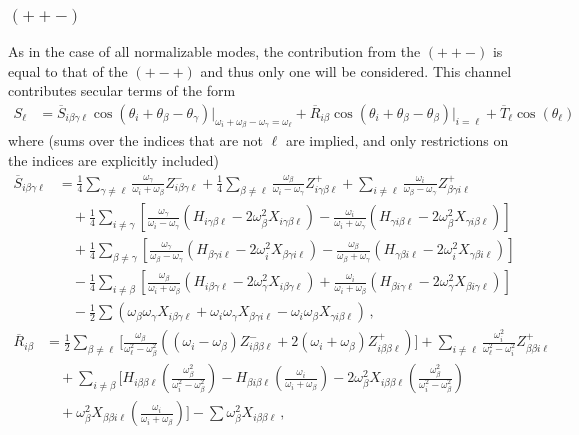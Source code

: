 \documentclass[letterpaper,11pt]{article}
\newcommand{\oi}{\omega_i}
\newcommand{\ol}{\omega_\ell}
\newcommand{\obet}{\omega_{\beta}}
\newcommand{\ogam}{\omega_\gamma}
\begin{document}
\subsubsection{$(++-)$}

As in the case of all normalizable modes, the contribution from the $(++-)$ is equal to that of the $(+-+)$ and thus only one will be considered. This channel contributes secular terms of the form
\begin{align}
S_\ell &= \overline{S}_{i \beta \gamma \ell} \cos \left( \theta_i + \theta_\beta - \theta_\gamma \right) \Big|_{\oi + \obet - \ogam = \ol} + \overline{R}_{i \beta} \cos \left(\theta_i + \theta_\beta - \theta_\beta \right) \Big|_{i = \ell} + \overline{T}_\ell \cos \left( \theta_\ell \right)
\end{align}
where (sums over the indices that are not $\ell$ are implied, and only restrictions on the indices are explicitly included)
\begin{align}
\overline{S}_{i \beta \gamma \ell} &= \frac{1}{4} \sum_{\gamma \neq \ell} \frac{\ogam}{\oi + \obet} Z^{-}_{i \beta \gamma \ell} + \frac{1}{4} \sum_{\beta \neq \ell} \frac{\obet}{\oi - \ogam} Z^+_{i \gamma \beta \ell} + \sum_{i \neq \ell} \frac{\oi}{\obet - \ogam} Z^+_{\beta \gamma i \ell} \nonumber \\
%
& \quad + \frac{1}{4} \sum_{i \neq \gamma} \left[ \frac{\omega_\gamma}{\oi - \ogam} (H_{i \gamma \beta \ell} - 2\obet^2 X_{i \gamma \beta \ell}) - \frac{\oi}{\oi + \ogam} (H_{\gamma i \beta \ell} - 2\obet^2 X_{\gamma i \beta \ell} ) \right] \nonumber \\
%
& \quad + \frac{1}{4} \sum_{\beta \neq \gamma} \left[ \frac{\ogam}{\obet - \ogam} (H_{\beta \gamma i \ell} - 2 \oi^2 X_{\beta\gamma i \ell} ) - \frac{\obet}{\obet + \ogam} (H_{\gamma \beta i \ell} - 2\oi^2 X_{\gamma \beta i \ell} ) \right] \nonumber \\
%
& \quad -  \frac{1}{4} \sum_{i \neq \beta} \left[ \frac{\obet}{\oi + \obet} (H_{i \beta \gamma \ell} - 2\ogam^2 X_{i \beta \gamma \ell} ) + \frac{\oi}{\oi + \obet} (H_{\beta i \gamma \ell} - 2\ogam^2 X_{\beta i \gamma \ell}) \right] \nonumber \\
%
& \quad - \frac{1}{2} \sum \left( \obet \ogam X_{i \beta \gamma \ell} + \oi \ogam X_{\beta \gamma i \ell} - \oi \obet X_{\gamma i \beta \ell} \right) \, ,
\end{align}
\begin{align}
\overline{R}_{i \beta} &= \frac{1}{2} \sum_{\beta \neq \ell} \Big[ \frac{\obet}{\ol^2 - \obet^2} \left( (\oi - \obet) Z^{-}_{i \beta \beta \ell} + 2 (\oi + \obet) Z^+_{i\beta \beta \ell} \right) \Big] + \sum_{i \neq \ell} \frac{\oi^2}{\ol^2 - \oi^2} Z^+_{\beta \beta i \ell} \nonumber \\
%
& \quad + \sum_{i \neq \beta} \Big[  H_{i \beta \beta \ell} \left( \frac{\obet^2}{\oi^2 - \obet^2} \right) - H_{\beta i \beta \ell} \left( \frac{\oi}{\oi + \obet} \right) - 2\obet^2 X_{i \beta \beta \ell} \left( \frac{\obet^2}{\oi^2 - \obet^2} \right) \nonumber \\
%
& \quad + \obet^2 X_{\beta \beta i \ell} \left( \frac{\oi}{\oi + \obet} \right) \Big] - \sum \obet^2 X_{i\beta\beta \ell} \, ,
\end{align}
\end{document}
